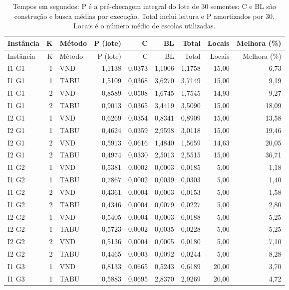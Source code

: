 \begin{longtable}{lrlrrrrrr}
\caption{Tempos em segundos: P é a pré-checagem integral do lote de 30 sementes; C e BL são construção e busca médias por execução. Total inclui leitura e P amortizados por 30. Locais é o número médio de escolas utilizadas.}\\
\toprule Instância & K & Método & P (lote) & C & BL & Total & Locais & Melhora (\%)\\\midrule\endfirsthead
\toprule Instância & K & Método & P (lote) & C & BL & Total & Locais & Melhora (\%)\\\midrule\endhead
I1 G1 & 1 & VND & 1,1138 & 0,0373 & 1,1006 & 1,1758 & 15,00 & 6,73 \\
I1 G1 & 1 & TABU & 1,5109 & 0,0368 & 3,6270 & 3,7149 & 15,00 & 9,19 \\
I1 G1 & 2 & VND & 0,8589 & 0,0508 & 1,6745 & 1,7545 & 14,93 & 9,27 \\
I1 G1 & 2 & TABU & 0,9013 & 0,0365 & 3,4419 & 3,5090 & 15,00 & 18,09 \\
I2 G1 & 1 & VND & 0,6269 & 0,0354 & 0,8341 & 0,8909 & 15,00 & 13,58 \\
I2 G1 & 1 & TABU & 0,4624 & 0,0359 & 2,9598 & 3,0118 & 15,00 & 19,46 \\
I2 G1 & 2 & VND & 0,5913 & 0,0616 & 1,4840 & 1,5659 & 14,63 & 20,05 \\
I2 G1 & 2 & TABU & 0,4974 & 0,0330 & 2,5013 & 2,5515 & 15,00 & 36,71 \\
I1 G2 & 1 & VND & 0,5381 & 0,0002 & 0,0003 & 0,0185 & 5,00 & 1,18 \\
I1 G2 & 1 & TABU & 0,7867 & 0,0002 & 0,0039 & 0,0303 & 5,00 & 1,40 \\
I1 G2 & 2 & VND & 0,4361 & 0,0004 & 0,0003 & 0,0153 & 5,00 & 1,58 \\
I1 G2 & 2 & TABU & 0,4346 & 0,0004 & 0,0079 & 0,0227 & 5,00 & 2,80 \\
I2 G2 & 1 & VND & 0,5405 & 0,0004 & 0,0003 & 0,0188 & 5,00 & 5,25 \\
I2 G2 & 1 & TABU & 0,5723 & 0,0002 & 0,0035 & 0,0228 & 5,00 & 5,25 \\
I2 G2 & 2 & VND & 0,5136 & 0,0004 & 0,0005 & 0,0180 & 5,00 & 7,10 \\
I2 G2 & 2 & TABU & 0,4465 & 0,0003 & 0,0092 & 0,0244 & 5,00 & 8,28 \\
I1 G3 & 1 & VND & 0,8133 & 0,0665 & 0,5243 & 0,6189 & 20,00 & 3,70 \\
I1 G3 & 1 & TABU & 0,5883 & 0,0695 & 2,8370 & 2,9269 & 20,00 & 4,72 \\

\end{longtable}
